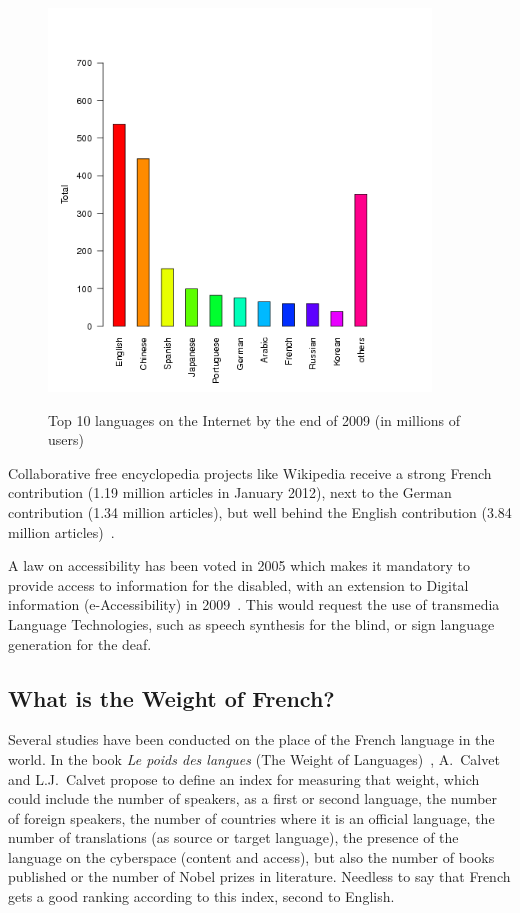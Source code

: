 \begin{multicols}{2}
\begin{figure}[ht]
\begin{center}
 \includegraphics[height=4.0in]{_media/french/french_pix2_top_10_Internet_languages_2010_english.png}
  \caption{Top 10 languages on the Internet by the end of 2009 (in millions of users)~\cite{internettop10}}
\label{fig:internettop10_en}
\end{center}
\end{figure}

Collaborative free encyclopedia projects like Wikipedia receive a
strong French contribution (1.19 million articles in January 2012),
next to the German contribution (1.34 million articles), but well behind the English contribution (3.84 million articles)~\cite{wikipediastats}.

A law on accessibility has been voted in 2005 which makes it mandatory
to provide access to information for the disabled, with an extension
to Digital information (e-Accessibility) in 2009~\cite{loi}. This would request
the use of transmedia Language Technologies, such as speech synthesis
for the blind, or sign language generation for the deaf.

\subsection{What is the Weight of French?}

Several studies have been conducted on the place of the French
language in the world. In the book {\em Le poids des
langues} (The Weight of Languages)~\cite{calvet09}, A.~Calvet and
L.J.~Calvet propose to define an index for measuring that weight,
which could include the number of speakers, as a first or second
language, the number of foreign speakers, the number of countries
where it is an official language, the number of translations (as
source or target language), the presence of the language on the
cyberspace (content and access), but also the number of books
published or the number of Nobel prizes in literature. Needless to say
that French gets a good ranking according to this index, second to
English.


\end{multicols}
